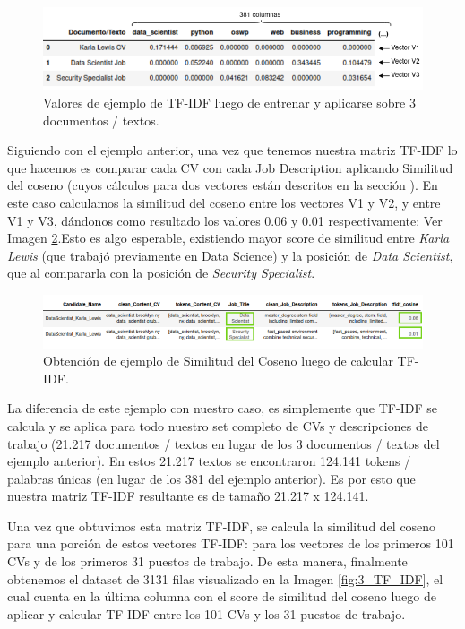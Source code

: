 \documentclass[12pt,a4paper]{article}
\begin{document}
\begin{sloppypar}
\begin{figure}[H] 
 \centering
 \includegraphics[width=1\textwidth]{images/implementacion_5/1_TF_IDF.png}
 \captionsetup{justification=centering,margin=3cm}
 \caption{Valores de ejemplo de TF-IDF luego de entrenar y aplicarse sobre 3 documentos / textos.} 
 \label{fig:1_TF_IDF}
\end{figure}

Siguiendo con el ejemplo anterior, una vez que tenemos nuestra matriz TF-IDF lo que hacemos es comparar cada CV con cada Job Description aplicando Similitud del coseno (cuyos cálculos para dos vectores están descritos en la sección \textit{}). En este caso calculamos la similitud del coseno entre los vectores V1 y V2, y entre V1 y V3, dándonos como resultado los valores 0.06 y 0.01 respectivamente: Ver Imagen \ref{fig:2_TF_IDF}.Esto es algo esperable, existiendo mayor score de similitud entre \textit{Karla Lewis} (que trabajó previamente en Data Science) y la posición de \textit{Data Scientist}, que al compararla con la posición de \textit{Security Specialist}. 

\begin{figure}[H] 
 \centering
 \includegraphics[width=1\textwidth]{images/implementacion_5/2_TF_IDF.png}
 \captionsetup{justification=centering,margin=3cm}
 \caption{Obtención de ejemplo de Similitud del Coseno luego de calcular TF-IDF.} 
 \label{fig:2_TF_IDF}
\end{figure}

La diferencia de este ejemplo con nuestro caso, es simplemente que TF-IDF se calcula y se aplica para todo nuestro set completo de CVs y descripciones de trabajo (21.217 documentos / textos en lugar de los 3 documentos / textos del ejemplo anterior). En estos 21.217 textos se encontraron 124.141 tokens / palabras únicas (en lugar de los 381 del ejemplo anterior). Es por esto que nuestra matriz TF-IDF resultante es de tamaño 21.217 x 124.141.

Una vez que obtuvimos esta matriz TF-IDF, se calcula la similitud del coseno para una porción de estos vectores TF-IDF: para los vectores de los primeros 101 CVs y de los primeros 31 puestos de trabajo. De esta manera, finalmente obtenemos el dataset de 3131 filas visualizado en la Imagen \ref{fig:3_TF_IDF}, el cual cuenta en la última columna con el score de similitud del coseno luego de aplicar y calcular TF-IDF entre los 101 CVs y los 31 puestos de trabajo.


\end{sloppypar}
\end{document}
